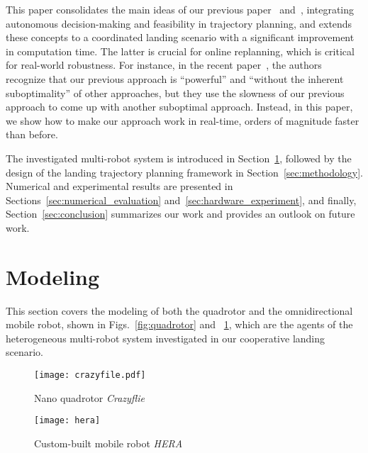 \documentclass[conference,preprint]{IEEEtran}
\begin{document}
This paper consolidates the main ideas of our previous paper~\cite{Luo2023} and~\cite{Chen2024}, integrating autonomous decision-making and feasibility in trajectory planning, and extends these concepts to a coordinated landing scenario with a significant improvement in computation time. 
The latter is crucial for online replanning, which is critical for real-world robustness. For instance, in the recent paper~\cite{Antal2025}, the authors recognize that our previous approach is ``powerful'' and ``without the inherent suboptimality'' of other approaches, but they use the slowness of our previous approach to come up with another suboptimal approach. Instead, in this paper, we show how to make our approach work in real-time, orders of magnitude faster than before.

The investigated multi-robot system is introduced in Section~\ref{sec:modeling}, followed by the design of the landing trajectory planning framework in Section~\ref{sec:methodology}. Numerical and experimental results are presented in Sections~\ref{sec:numerical_evaluation} and~\ref{sec:hardware_experiment}, and finally, Section~\ref{sec:conclusion} summarizes our work and provides an outlook on future work.


\section{Modeling}
\label{sec:modeling}

This section covers the modeling of both the quadrotor and the omnidirectional mobile robot, shown in Figs.~\ref{fig:quadrotor} and ~\ref{fig:omni}, which are the agents of the heterogeneous multi-robot system investigated in our cooperative landing scenario.

\begin{figure}
  \centering
  \begin{minipage}{0.45\columnwidth}
      \centering
      \texttt{[image: crazyfile.pdf]}
      \caption{Nano quadrotor \textit{Crazyflie}~\cite{Giernacki2017}}
      \label{fig:quadrotor}
  \end{minipage}\hfill
  \begin{minipage}{0.45\columnwidth}
      \centering
      \texttt{[image: hera]}
      \caption{Custom-built mobile robot \textit{HERA}~\cite{Ebel2021}}
      \label{fig:omni}
  \end{minipage}
\end{figure}
\end{document}
